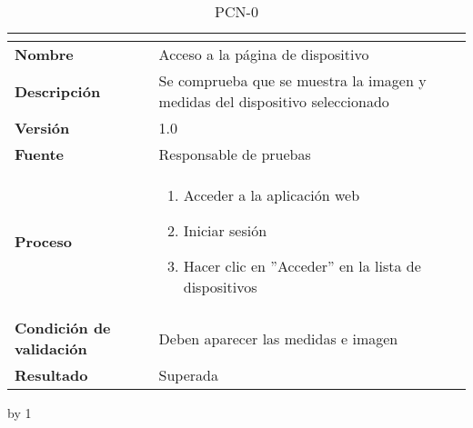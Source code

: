 \begin{table}[H]
	\caption{PCN-0\number\pcn}
	\begin{tabular}{|l|p{}|}
		\hline
		\multicolumn{2}{|c|}{\cellcolor[HTML]{BFBFBF}{\color[HTML]{000000} \textbf{PCN-0\number\pcn}}} \\ \hline
		\textbf{Nombre}                  & Acceso a la página de dispositivo                                            \\ \hline
		\textbf{Descripción}             & Se comprueba que se muestra la imagen y medidas del dispositivo seleccionado \\ \hline
		\textbf{Versión}                 & 1.0                                                                          \\ \hline
		\textbf{Fuente}                  & Responsable de pruebas                                                       \\ \hline
		\textbf{Proceso}                 & \begin{enumerate}
			\item Acceder a la aplicación web
			\item Iniciar sesión
			\item Hacer clic en ''Acceder'' en la lista de dispositivos
		\end{enumerate}                                                   \\ \hline		
		\textbf{Condición de validación} & Deben aparecer las medidas e imagen                                          \\ \hline
		\textbf{Resultado}               & Superada                                                                     \\ \hline
	\end{tabular}
\end{table}
\advance\pcn by 1
